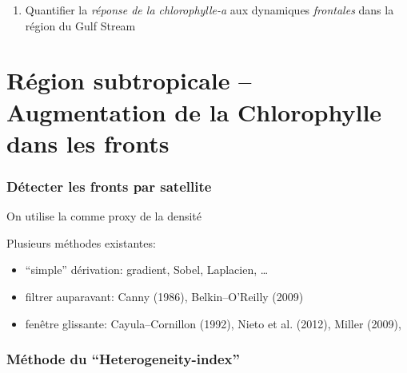 \begin{frame}
  \vspace{2em}

  \begin{enumerate}
    \setlength{\itemsep}{1em}
    \item Quantifier la \emph{réponse de la chlorophylle-a} aux dynamiques \emph{frontales} dans la région du Gulf Stream
  \end{enumerate}
\end{frame}


\section{Région subtropicale -- Augmentation de la Chlorophylle dans les fronts}

\begin{frame}
  \frametitle{Détecter les fronts par satellite}

  \begin{block}{}
    On utilise la  comme proxy de la densité
  \end{block}

  \begin{block}{}
    Plusieurs méthodes existantes:
    \begin{itemize}
            \setlength{\itemsep}{1.2em}
      \item “simple” dérivation: gradient, Sobel, Laplacien, \dots
      \item filtrer auparavant: Canny (1986), Belkin--O'Reilly (2009)
      \item fenêtre glissante: Cayula--Cornillon (1992), Nieto et al. (2012), Miller (2009), 
    \end{itemize}
  \end{block}
\end{frame}


\begin{frame}
  \frametitle{Méthode du “Heterogeneity-index”}
  \\[1em]

\end{frame}

